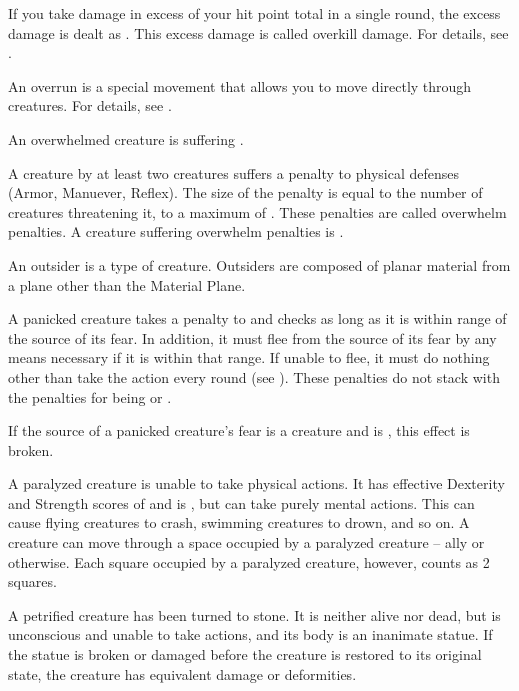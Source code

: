  If you take damage in excess of your  hit point total in a single round, the excess damage is dealt as .
This excess damage is called overkill damage.
For details, see .

 An overrun is a special movement that allows you to move directly through creatures.
For details, see .

 An overwhelmed creature is suffering .

 A creature  by at least two creatures suffers a penalty to physical defenses (Armor, Manuever, Reflex).
The size of the penalty is equal to the number of creatures threatening it, to a maximum of .
These penalties are called overwhelm penalties.
A creature suffering overwhelm penalties is .

 An outsider is a type of creature.
Outsiders are composed of planar material from a plane other than the Material Plane.

 A panicked creature takes a  penalty to  and checks as long as it is within \rngmed range of the source of its fear.
In addition, it must flee from the source of its fear by any means necessary if it is within that range.
If unable to flee, it must do nothing other than take the  action every round (see ).
These penalties do not stack with the penalties for being \shaken or \panicked.

If the source of a panicked creature's fear is a creature and is , this effect is broken.

 A paralyzed creature is unable to take physical actions. It has effective Dexterity and Strength scores of  and is \helpless, but can take purely mental actions. This can cause flying creatures to crash, swimming creatures to drown, and so on. A creature can move through a space occupied by a paralyzed creature -- ally or otherwise. Each square occupied by a paralyzed creature, however, counts as 2 squares.

 A petrified creature has been turned to stone. It is neither alive nor dead, but is unconscious and unable to take actions, and its body is an inanimate statue. If the statue is broken or damaged before the creature is restored to its original state, the creature has equivalent damage or deformities.

